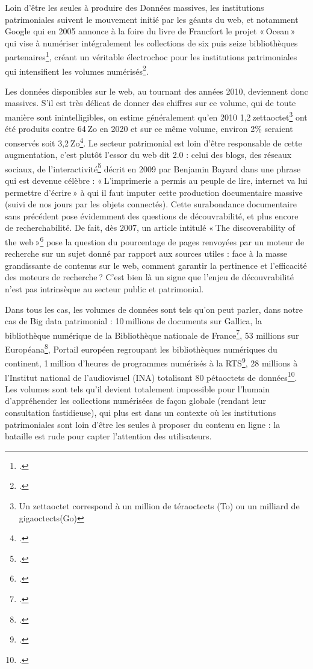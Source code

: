 Loin d’être les seules à produire des Données massives, les institutions patrimoniales suivent le mouvement initié par les géants du web, et notamment Google qui en 2005 annonce à la foire du livre de Francfort le projet « Ocean » qui vise à numériser intégralement les collections de six puis seize bibliothèques partenaires\footcite{ertzscheid2019}, créant un véritable électrochoc pour les institutions patrimoniales qui intensifient les volumes numérisés\footcite{bermes2024}.

Les données disponibles sur le web, au tournant des années 2010, deviennent donc massives. S’il est très délicat de donner des chiffres sur ce volume, qui de toute manière sont inintelligibles, on estime généralement qu’en 2010 1,2 zettaoctet\footnote{Un zettaoctet correspond à un million de téraoctects (To) ou un milliard de gigaoctects(Go)} ont été produits contre 64 Zo en 2020 et sur ce même volume, environ 2\% seraient conservés soit 3,2 Zo\footcite{zotero-284}. Le secteur patrimonial est loin d’être responsable de cette augmentation, c’est plutôt l’essor du web dit 2.0 : celui des blogs, des réseaux sociaux, de l’interactivité\footcite{zotero-283} décrit en 2009 par Benjamin Bayard dans une phrase qui est devenue célèbre : « L’imprimerie a permis au peuple de lire, internet va lui permettre d’écrire » à qui il faut imputer cette production documentaire massive (suivi de nos jours par les objets connectés). Cette surabondance documentaire sans précédent pose évidemment des questions de découvrabilité, et plus encore de recherchabilité. De fait, dès 2007, un article intitulé « The discoverability of the web »\footcite{dasgupta2007} pose la question du pourcentage de pages renvoyées par un moteur de recherche sur un sujet donné par rapport aux sources utiles : face à la masse grandissante de contenus sur le web, comment garantir la pertinence et l’efficacité des moteurs de recherche ? C’est bien là un signe que l’enjeu de découvrabilité n’est pas intrinsèque au secteur public et patrimonial.

Dans tous les cas, les volumes de données sont tels qu’on peut parler, dans notre cas de Big data patrimonial : 10 millions de documents sur Gallica, la bibliothèque numérique de la Bibliothèque nationale de France\footcite{zotero-281}, 53 millions sur Européana\footcite{zotero-280}, Portail européen regroupant les bibliothèques numériques du continent, 1 million d’heures de programmes numérisés à la RTS\footcite{sonderegger2024}, 28 millions à l’Institut national de l’audiovisuel (INA) totalisant 80 pétaoctets de données\footcite{alquier2024}. Les volumes sont tels qu’il devient totalement impossible pour l’humain d’appréhender les collections numérisées de façon globale (rendant leur consultation fastidieuse), qui plus est dans un contexte où les institutions patrimoniales sont loin d’être les seules à proposer du contenu en ligne : la bataille est rude pour capter l’attention des utilisateurs.

